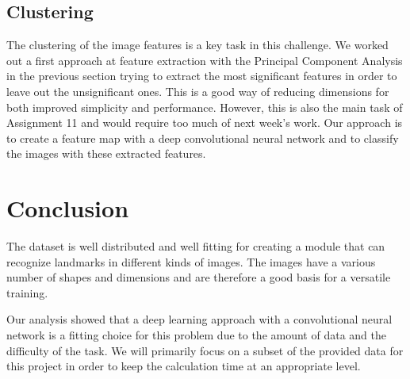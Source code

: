 \section*{Clustering}

The clustering of the image features is a key task in this challenge. We worked out a first approach at feature extraction with the Principal Component Analysis in the previous section trying to extract the most significant features in order to leave out the unsignificant ones. This is a good way of reducing dimensions for both improved simplicity and performance. However, this is also the main task of Assignment 11 and would require too much of next week's work. Our approach is to create a feature map with a deep convolutional neural network and to classify the images with these extracted features.

\chapter{Conclusion}

The dataset is well distributed and well fitting for creating a module that can recognize landmarks in different kinds of images. The images have a various number of shapes and dimensions and are therefore a good basis for a versatile training.

Our analysis showed that a deep learning approach with a convolutional neural network is a fitting choice for this problem due to the amount of data and the difficulty of the task. We will primarily focus on a subset of the provided data for this project in order to keep the calculation time at an appropriate level.